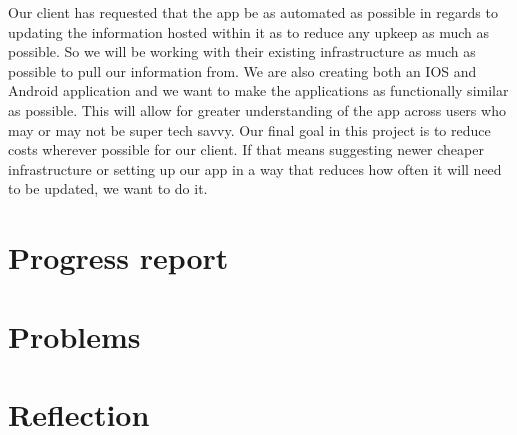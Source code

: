 \documentclass[letterpaper,10pt,draftclsnofoot,onecolumn,titlepage]{IEEEtran}
\begin{document}
	Our client has requested that the app be as automated as possible in regards to updating the information hosted within it as to reduce any upkeep as much as possible. 
	So we will be working with their existing infrastructure as much as possible to pull our information from. 
	We are also creating both an IOS and Android application and we want to make the applications as functionally similar as possible. 
	This will allow for greater understanding of the app across users who may or may not be super tech savvy. 
	Our final goal in this project is to reduce costs wherever possible for our client. 
	If that means suggesting newer cheaper infrastructure or setting up our app in a way that reduces how often it will need to be updated, we want to do it. 

		
		\section{Progress report}

		\section{Problems}

		\section{Reflection}
			
		
		
		
\end{document}

